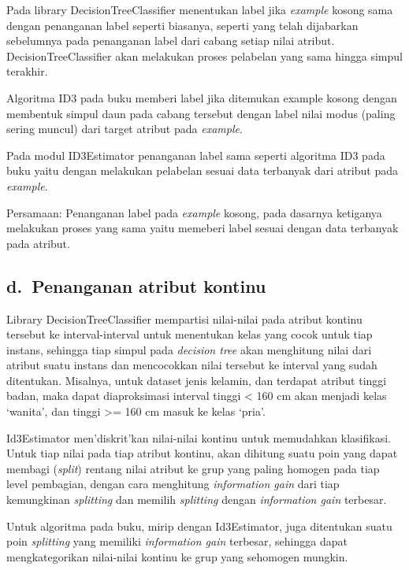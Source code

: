 \documentclass[11pt]{article}
\begin{document}
    Pada library DecisionTreeClassifier menentukan label jika \emph{example}
kosong sama dengan penanganan label seperti biasanya, seperti yang telah
dijabarkan sebelumnya pada penanganan label dari cabang setiap nilai
atribut. DecisionTreeClassifier akan melakukan proses pelabelan yang
sama hingga simpul terakhir.

Algoritma ID3 pada buku memberi label jika ditemukan example kosong
dengan membentuk simpul daun pada cabang tersebut dengan label nilai
modus (paling sering muncul) dari target atribut pada \emph{example}.

Pada modul ID3Estimator penanganan label sama seperti algoritma ID3 pada
buku yaitu dengan melakukan pelabelan sesuai data terbanyak dari atribut
pada \emph{example}.

Persamaan: Penanganan label pada \emph{example} kosong, pada dasarnya
ketiganya melakukan proses yang sama yaitu memeberi label sesuai dengan
data terbanyak pada atribut.

    \hypertarget{d.-penanganan-atribut-kontinu}{%
\subsection{d.~Penanganan atribut
kontinu}\label{d.-penanganan-atribut-kontinu}}

    Library DecisionTreeClassifier mempartisi nilai-nilai pada atribut
kontinu tersebut ke interval-interval untuk menentukan kelas yang cocok
untuk tiap instans, sehingga tiap simpul pada \emph{decision tree} akan
menghitung nilai dari atribut suatu instans dan mencocokkan nilai
tersebut ke interval yang sudah ditentukan. Misalnya, untuk dataset
jenis kelamin, dan terdapat atribut tinggi badan, maka dapat
diaproksimasi interval tinggi \textless{} 160 cm akan menjadi kelas
`wanita', dan tinggi \textgreater= 160 cm masuk ke kelas `pria'.

Id3Estimator men'diskrit'kan nilai-nilai kontinu untuk memudahkan
klasifikasi. Untuk tiap nilai pada tiap atribut kontinu, akan dihitung
suatu poin yang dapat membagi (\emph{split}) rentang nilai atribut ke
grup yang paling homogen pada tiap level pembagian, dengan cara
menghitung \emph{information gain} dari tiap kemungkinan
\emph{splitting} dan memilih \emph{splitting} dengan \emph{information
gain} terbesar.

Untuk algoritma pada buku, mirip dengan Id3Estimator, juga ditentukan
suatu poin \emph{splitting} yang memiliki \emph{information gain}
terbesar, sehingga dapat mengkategorikan nilai-nilai kontinu ke grup
yang sehomogen mungkin.
\end{document}
